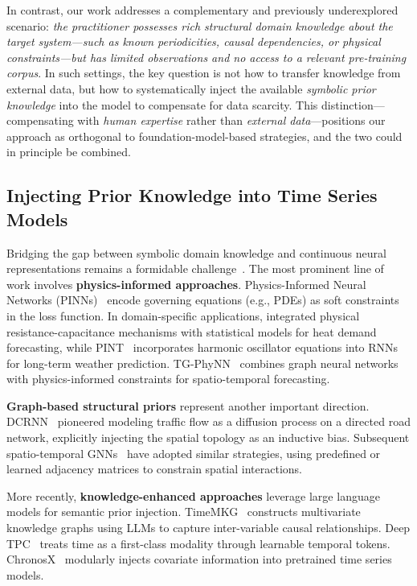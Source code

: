 In contrast, our work addresses a complementary and previously underexplored scenario: \emph{the practitioner possesses rich structural domain knowledge about the target system---such as known periodicities, causal dependencies, or physical constraints---but has limited observations and no access to a relevant pre-training corpus}. In such settings, the key question is not how to transfer knowledge from external data, but how to systematically inject the available \emph{symbolic prior knowledge} into the model to compensate for data scarcity. This distinction---compensating with \emph{human expertise} rather than \emph{external data}---positions our approach as orthogonal to foundation-model-based strategies, and the two could in principle be combined.

\subsection{Injecting Prior Knowledge into Time Series Models}

Bridging the gap between symbolic domain knowledge and continuous neural representations remains a formidable challenge~\citep{besold2017neural}. The most prominent line of work involves \textbf{physics-informed approaches}. Physics-Informed Neural Networks (PINNs)~\citep{raissi2019physics, hao2023physics} encode governing equations (e.g., PDEs) as soft constraints in the loss function. In domain-specific applications, \citet{zhang2024prior} integrated physical resistance-capacitance mechanisms with statistical models for heat demand forecasting, while PINT~\citep{smith2025pint} incorporates harmonic oscillator equations into RNNs for long-term weather prediction. TG-PhyNN~\citep{chen2024tgphynn} combines graph neural networks with physics-informed constraints for spatio-temporal forecasting.

\textbf{Graph-based structural priors} represent another important direction. DCRNN~\citep{li2018diffusion} pioneered modeling traffic flow as a diffusion process on a directed road network, explicitly injecting the spatial topology as an inductive bias. Subsequent spatio-temporal GNNs~\citep{wu2020connecting, yu2018spatio} have adopted similar strategies, using predefined or learned adjacency matrices to constrain spatial interactions.

More recently, \textbf{knowledge-enhanced approaches} leverage large language models for semantic prior injection. TimeMKG~\citep{liu2025timemkg} constructs multivariate knowledge graphs using LLMs to capture inter-variable causal relationships. Deep TPC~\citep{chen2025deeptpc} treats time as a first-class modality through learnable temporal tokens. ChronosX~\citep{arango2025chronosx} modularly injects covariate information into pretrained time series models.

